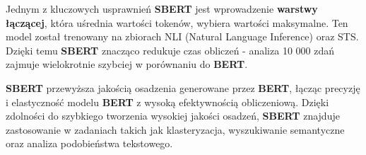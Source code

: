 Jednym z kluczowych usprawnień \textbf{SBERT} jest wprowadzenie \textbf{warstwy łączącej}, która uśrednia wartości tokenów, wybiera wartości
maksymalne. Ten model został trenowany na zbiorach NLI (Natural Language Inference) oraz STS.
Dzięki temu \textbf{SBERT} znacząco redukuje czas obliczeń - analiza 10 000 zdań
zajmuje wielokrotnie szybciej w porównaniu do \textbf{BERT}.

\textbf{SBERT} przewyższa jakością osadzenia generowane przez \textbf{BERT}, łącząc
precyzję i elastyczność modelu \textbf{BERT} z wysoką efektywnością obliczeniową.
Dzięki zdolności do szybkiego tworzenia wysokiej jakości osadzeń, \textbf{SBERT}
znajduje zastosowanie w zadaniach takich jak klasteryzacja, wyszukiwanie
semantyczne oraz analiza podobieństwa tekstowego.